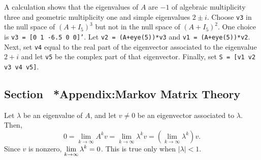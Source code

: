 \soln  A \Matlab calculation shows that the eigenvalues of $A$ are $-1$ of 
algebraic multiplicity three and geometric multiplicity one and simple 
eigenvalues $2\pm i$.  Choose {\tt v3} in the null space of $(A+I_5)^3$ but not in the null space of 
$(A+I_5)^2$.  One choice is {\tt v3 = [0 1 -6.5 0 0]'}.  Let {\tt v2 = (A+eye(5))*v3}
and {\tt v1 = (A+eye(5))*v2}.  Next, set {\tt v4} equal to the real part of the
eigenvector associated to the eigenvalue $2+i$ and let {\tt v5} be the complex part of
that eigenvector.  Finally, set {\tt S = [v1 v2 v3 v4 v5]}.


\subsection*{Section~\protect{\ref{S:TransitionTheory}} *Appendix:Markov Matrix
Theory}

Let $\lambda$ be an eigenvalue of $A$, and let $v \neq 0$ be an eigenvector
associated to $\lambda$.  Then,
\[
0 = \lim_{k \to \infty}A^kv = \lim_{k \to \infty}\lambda^kv
= \left(\lim_{k \to \infty}\lambda^k\right)v.
\]
Since $v$ is nonzero,
$\displaystyle \lim_{k \to \infty}\lambda^k = 0$.  This is true only when
$|\lambda| < 1$.



 
